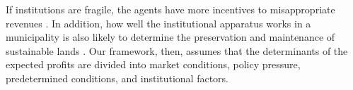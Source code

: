 If institutions are fragile, the agents have more incentives to misappropriate revenues \citep{GARCIA, ALBUQUERQUE, BROLLO_2013, BUGARIN}. In addition, how well the institutional apparatus works in a municipality is also likely to determine the preservation and maintenance of sustainable lands \citep{ROCHEDO2018}. Our framework, then, assumes that the determinants of the expected profits are divided into market conditions, policy pressure, predetermined conditions, and institutional factors.





